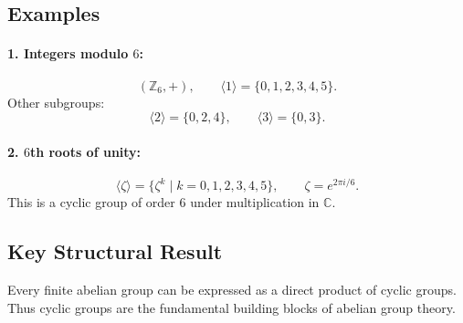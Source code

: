 \documentclass[12pt,a4paper]{article}
\begin{document}
	\subsection*{Examples}
	
	\paragraph{1. Integers modulo $6$:}
	\[
	(\mathbb{Z}_6, +), \qquad 
	\langle 1 \rangle = \{0,1,2,3,4,5\}.
	\]
	Other subgroups:
	\[
	\langle 2 \rangle = \{0,2,4\}, \qquad 
	\langle 3 \rangle = \{0,3\}.
	\]
	
	\paragraph{2. $6$th roots of unity:}
	\[
	\langle \zeta \rangle = \{ \zeta^k \mid k=0,1,2,3,4,5 \}, \qquad 
	\zeta = e^{2\pi i/6}.
	\]
	This is a cyclic group of order $6$ under multiplication in $\mathbb{C}$.
	
	\subsection*{Key Structural Result}
	Every finite abelian group can be expressed as a direct product of cyclic groups.  
	Thus cyclic groups are the fundamental building blocks of abelian group theory.
	
\end{document}

